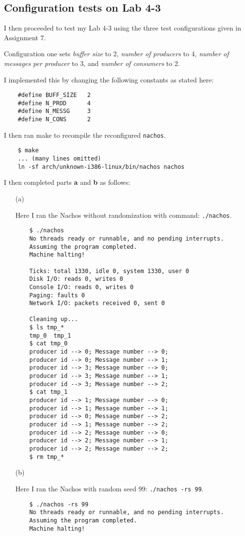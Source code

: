 \documentclass[11pt]{article}
\begin{document}
    \subsection{Configuration tests on Lab 4-3}

    I then proceeded to test my Lab 4-3 using the three test configurations given in Assignment 7.

    \setcounter{qsection}{0}
    \begin{question}
        Configuration one sets {\it buffer size} to 2, {\it number of producers} to 4,  {\it number of messages per producer} to 3, and {\it number of consumers} to 2.

    \begin{subquestion}
        I implemented this by changing the following constants as stated here:
        \begin{verbatim}
    #define BUFF_SIZE   2
    #define N_PROD      4
    #define N_MESSG     3
    #define N_CONS      2
        \end{verbatim}

        I then ran make to recompile the reconfigured {\tt nachos}.
        \begin{verbatim}
    $ make
    ... (many lines omitted)
    ln -sf arch/unknown-i386-linux/bin/nachos nachos
        \end{verbatim}

        I then completed parts {\bf a} and {\bf b} as follows:
        \begin{itemize}
            \item[(a)]{
                Here I ran the Nachos without randomization with command: {\tt ./nachos}.
                \begin{verbatim}
    $ ./nachos
    No threads ready or runnable, and no pending interrupts.
    Assuming the program completed.
    Machine halting!

    Ticks: total 1330, idle 0, system 1330, user 0
    Disk I/O: reads 0, writes 0
    Console I/O: reads 0, writes 0
    Paging: faults 0
    Network I/O: packets received 0, sent 0

    Cleaning up...
    $ ls tmp_*
    tmp_0  tmp_1
    $ cat tmp_0
    producer id --> 0; Message number --> 0;
    producer id --> 0; Message number --> 1;
    producer id --> 3; Message number --> 0;
    producer id --> 3; Message number --> 1;
    producer id --> 3; Message number --> 2;
    $ cat tmp_1
    producer id --> 1; Message number --> 0;
    producer id --> 1; Message number --> 1;
    producer id --> 0; Message number --> 2;
    producer id --> 1; Message number --> 2;
    producer id --> 2; Message number --> 0;
    producer id --> 2; Message number --> 1;
    producer id --> 2; Message number --> 2;
    $ rm tmp_*
                \end{verbatim}
            }
            \item[(b)]{
                Here I ran the Nachos with random seed 99: {\tt ./nachos -rs 99}.
                \begin{verbatim}
    $ ./nachos -rs 99
    No threads ready or runnable, and no pending interrupts.
    Assuming the program completed.
    Machine halting!


\end{verbatim}}
\end{itemize}
\end{subquestion}
\end{question}
\end{document}
